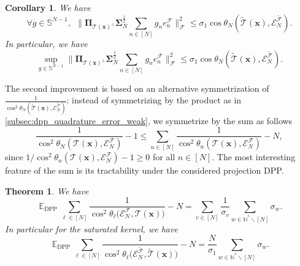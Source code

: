 \documentclass[twoside,11pt]{book}
\newtheorem{corollary}{Corollary}
\newtheorem{theorem}{Theorem}
\DeclareMathOperator{\DPP}{\mathrm{DPP}}
\DeclareMathOperator{\EX}{\mathbb{E}}
\begin{document}
\begin{corollary}
We have 
\begin{equation}\label{eq:kernel_perturbation_inequality_generalization_principal_angles}
    \forall g \in \mathbb{S}^{N-1}, \:\: \|\bm{\Pi}_{\mathcal{T}(\bm{x})^{\perp}} \bm{\Sigma}_{N}^{\frac{1}{2}} \sum\limits_{n \in [N]}g_{n} e_{n}^{\mathcal{F}}\|_{\mathcal{F}}^{2} \leq \sigma_{1} \cos  \theta_{N}(\tilde{\mathcal{T}}(\bm{x}),\mathcal{E}_{N}^{\tilde{\mathcal{F}}}).
\end{equation}
In particular, we have
\begin{equation}\label{eq:kernel_perturbation_inequality_generalization_principal_angles}
     \sup\limits_{g \in \mathbb{S}^{N-1}}\|\bm{\Pi}_{\mathcal{T}(\bm{x})^{\perp}} \bm{\Sigma}_{N}^{\frac{1}{2}} \sum\limits_{n \in [N]}g_{n} e_{n}^{\mathcal{F}}\|_{\mathcal{F}}^{2} \leq \sigma_{1} \cos \theta_{N}(\tilde{\mathcal{T}}(\bm{x}),\mathcal{E}_{N}^{\tilde{\mathcal{F}}}).
\end{equation}

\end{corollary}

The second improvement is based on an alternative symmetrization of $\displaystyle \frac{1}{\cos^{2} \theta_{N}(\tilde{\mathcal{T}}(\bm{x}),\mathcal{E}_{N}^{\tilde{\mathcal{F}}})}$: instead of symmetrizing by the product as in \ref{subsec:dpp_quadrature_error_weak}, we symmetrize by the sum as follows
\begin{equation}\label{eq:additive_symmetrization}
\frac{1}{\cos^{2} \theta_{N}(\mathcal{T}(\bm{x}),\mathcal{E}_{N}^{\mathcal{F}})} -1 \leq \sum\limits_{n \in [N]}\frac{1}{\cos^{2} \theta_{n}(\mathcal{T}(\bm{x}),\mathcal{E}_{N}^{\mathcal{F}})} -N,
\end{equation}
since $1/\cos^{2} \theta_{n}(\mathcal{T}(\bm{x}),\mathcal{E}_{N}^{\mathcal{F}})-1 \geq 0$ for all $n \in [N]$. The most interesting feature of the sum is its tractability under the considered projection DPP.

\begin{theorem}\label{thm:ex_dpp_sum_inv_cos}
We have
\begin{equation}
\EX_{\DPP}  \sum\limits_{\ell \in [N]} \frac{1}{\cos^{2} \theta_{\ell} \bigg(\mathcal{E}^{\mathcal{F}}_{N}, \mathcal{T}(\bm{x}) \bigg)} -N =  \sum\limits_{v \in [N]} \frac{1}{\sigma_{v}} \sum\limits_{w \in \mathbb{N}^{*}\smallsetminus [N]} \sigma_{w}.
\end{equation}
In particular for the saturated kernel, we have
\begin{equation}
\EX_{\DPP}  \sum\limits_{\ell \in [N]} \frac{1}{\cos^{2} \theta_{\ell} \bigg(\mathcal{E}^{\tilde{\mathcal{F}}}_{N}, \tilde{\mathcal{T}}(\bm{x}) \bigg)}  -N =  \frac{N}{\sigma_{1}} \sum\limits_{w \in \mathbb{N}^{*}\smallsetminus [N]} \sigma_{w}.
\end{equation}
\end{theorem}
\end{document}
